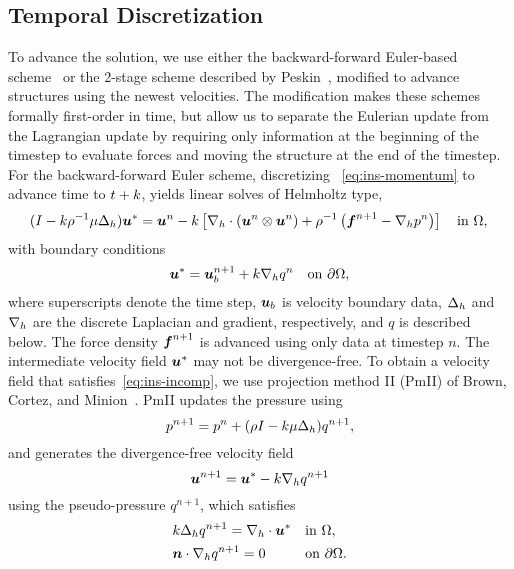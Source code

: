 

\subsection{Temporal Discretization}\label{sec:ns_time}

To advance the solution, we use either the backward-forward Euler-based scheme~\cite{Ascher:1997tm} or the 2-stage
scheme described by Peskin~\cite{Peskin:2002go}, modified to advance structures using the newest velocities. The
modification makes these schemes formally first-order in time, but allow us to separate the Eulerian update from
the Lagrangian update by requiring only information at the beginning of the timestep to evaluate forces and moving
the structure at the end of the timestep. For the backward-forward Euler scheme, discretizing~%
\eqref{eq:ins-momentum} to advance time to $t+k$, yields linear solves of Helmholtz type,
\begin{equation}\label{eq:disc-momentum}
    (I - \timestep\rho^{-1}\mu \laplacian_h) \u^\ast = \u^n - \timestep\left[\div[h]\left(\u^n\otimes\u^n\right) + \rho^{-1}\left(\f^{n+1} - \grad[h]p^n\right)\right] \quad\text{in}~\domain, \\
\end{equation}
with boundary conditions
\begin{equation}\label{eq:disc-bdy}
    \u^\ast = \u^{n+1}_b + \timestep \grad[h] q^{n} \quad\text{on}~\partial\domain,
\end{equation}
where superscripts denote the time step, $\boldsymbol{u}_b$ is velocity boundary data, $\Delta_h$ and $\grad[h]$ are the
discrete Laplacian and gradient, respectively, and $q$ is described below. The force density $\boldsymbol{f}^{n+1}$ is
advanced using only data at timestep $n$. The intermediate velocity field $\boldsymbol{u}^\ast$ may not be divergence-free. To
obtain a velocity field that satisfies~\eqref{eq:ins-incomp}, we use projection method II (PmII) of Brown, Cortez,
and Minion~\cite{Brown:2001bq}. PmII updates the pressure using
\begin{equation}
    p^{n+1} = p^n + (\rho I - k\mu\Delta_h)q^{n+1},
\end{equation}
and generates the divergence-free velocity field
\begin{equation}\label{eq:vel-update}
    \u^{n+1} = \u^\ast - \timestep\grad[h]q^{n+1}
\end{equation}
using the pseudo-pressure $q^{n+1}$, which satisfies
\begin{equation}
\begin{alignedat}{2}
    &k \laplacian_h q^{n+1} = \div[h]\u^\ast &&\quad \text{in}~\domain, \\
    &\n\cdot\grad[h] q^{n+1} = 0                    &&\quad \text{on}~\partial\domain.
\end{alignedat}
\end{equation}
